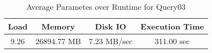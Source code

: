 \documentclass[../../main.tex]{subfiles}
\begin{document}
    \begin{table}
        \begin{center}
            \begin{tabular}{ |c|c|c|c| } 
            \hline
            Load & Memory & Disk IO & Execution Time\\
            \hline
            9.26 & 26894.77 MB & 7.23 MB/sec & 311.00 sec \\
            \hline
            \end{tabular}
            \\[1pt]
            \caption{Average Parametes over Runtime for Query03}
        \end{center}
    \end{table}
    \pagebreak
\end{document}
